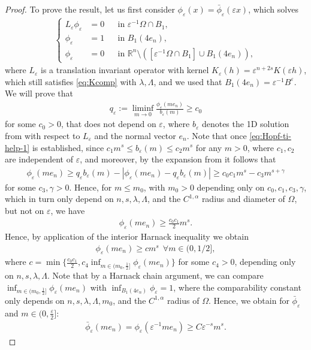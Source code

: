 \documentclass[11pt,reqno]{amsart}
\theoremstyle{plain}
\theoremstyle{definition}
\numberwithin{equation}{section}
\newcommand{\R}{\mathbb{R}}
\newcommand{\eps}{\varepsilon}
\newcommand{\1}{\mathbbm{1}}
\begin{document}
\begin{proof}
To prove the result, let us first consider $\phi_{\eps}(x) = \bar{\phi}_{\eps}(\eps x)$, which solves
\begin{align*}
    \left\{
    \begin{aligned}
            L_{\eps} \phi_{\eps} &= 0 &&\text{in } \eps^{-1}\Omega \cap B_1,\\
            \phi_{\eps} &= 1 &&\text{in } B_{1}(4e_n),\\
            \phi_{\eps} & = 0 &&\text{in } \R^n \setminus ([\eps^{-1} \Omega \cap B_1] \cup B_{1}(4e_n)),
    \end{aligned}
    \right.
\end{align*}
where $L_{\eps}$ is a translation invariant operator with kernel $K_{\eps}(h) = \eps^{n+2s} K(\eps h)$, which still satisfies \eqref{eq:Kcomp} with $\lambda,\Lambda$, and we used that $B_{1}(4 e_n) = \eps^{-1} B^{\eps}$. We will prove that
\begin{align}
\label{eq:Hopf-ti-help-1}
  q_{\eps} := \liminf_{m \to 0} \frac{\phi_{\eps}(m e_n)}{b_{\eps}(m)} \ge c_0
\end{align}
for some $c_0 > 0$, that does not depend on $\eps$, where $b_{\eps}$ denotes the 1D solution from \cite[Theorem 6.9]{RoWe24} with respect to $L_{\eps}$ and the normal vector $e_n$. Note that once \eqref{eq:Hopf-ti-help-1} is established, since $c_1 m^s \le b_{\eps}(m) \le c_2 m^s$ for any $m > 0$, where $c_1,c_2$ are independent of $\eps$, and moreover, by the expansion from \cite[Theorem 6.9]{RoWe24} it follows that
\begin{align*}
    \phi_{\eps}(m e_n) \ge q_{\eps} b_{\eps}(m) - |\phi_{\eps}(m e_n) - q_{\eps} b_{\eps}(m)| \ge c_0 c_1 m^s - c_3 m^{s+\gamma}
\end{align*}
for some $c_3, \gamma > 0$. Hence, for $m \le m_0$, with $m_0 > 0$ depending only on $c_0,c_1,c_3, \gamma$, which in turn only depend on $n,s,\lambda,\Lambda$, and the $C^{1,\alpha}$ radius and diameter of $\Omega$, but not on $\eps$, we have
\begin{align*}
    \phi_{\eps}(m e_n) \ge \frac{c_0 c_1}{2} m^s.
\end{align*}
Hence, by application of the interior Harnack inequality we obtain
\begin{align*}
    \phi_{\eps}(m e_n) \ge c m^s ~~ \forall m \in (0,1/2],
\end{align*} 
where $c = \min\{\frac{c_0 c_1}{2} , c_4 \inf_{ m \in (m_0,\frac{1}{2}]}   \phi_{\eps}(m e_n) \}$ for some $c_4 > 0$, depending only on $n,s,\lambda,\Lambda$. Note that by a Harnack chain argument, we can compare $\inf_{ m \in (m_0,\frac{1}{2}]}   \phi_{\eps}(m e_n)$ with $\inf_{B_1(4 e_n)} \phi_{\eps} = 1$, where the comparability constant only depends on $n,s,\lambda,\Lambda,m_0$, and the $C^{1,\alpha}$ radius of $\Omega$.
Hence, we obtain for $\bar{\phi}_{\eps}$ and $m \in (0,\frac{\eps}{2}]$:
\begin{align*}
    \bar{\phi}_{\eps}(m e_n) = \phi_{\eps}(\eps^{-1} m e_n) \ge C \eps^{-s} m^s.
\end{align*}


\end{proof}
\end{document}
